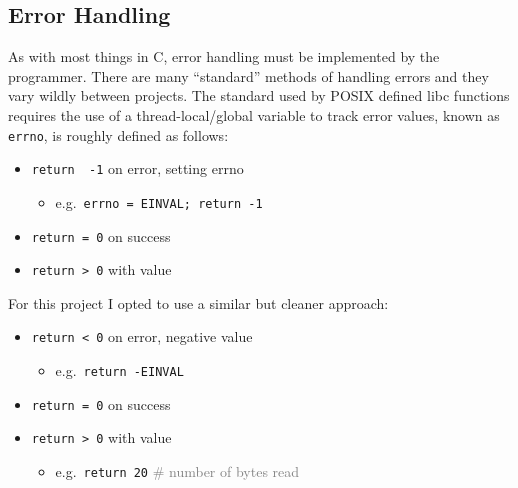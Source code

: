     \subsection{Error Handling}
        As with most things in C, error handling must be implemented by the programmer. There are many ``standard'' methods of handling errors and they vary wildly between projects. The standard used by POSIX defined libc functions requires the use of a thread-local/global variable to track error values, known as \texttt{errno}, is roughly defined as follows:
        \begin{center}
            \begin{minipage}{0.88\columnwidth}
                \begin{itemize}[noitemsep]
                    \item{\texttt{return\ \ -1} on error, setting errno}
                        \begin{itemize}
                            \item[]{\small e.g.\ \texttt{errno = EINVAL;\ return -1}}
                        \end{itemize}
                    \item{\texttt{return = 0} on success}
                    \item{\texttt{return > 0} with value}
                \end{itemize}
            \end{minipage}
        \end{center}
        \vspace{\parskip}

        For this project I opted to use a similar but cleaner approach:
        \begin{center}
            \begin{minipage}{0.88\columnwidth}
                \begin{itemize}[noitemsep]
                    \item{\texttt{return < 0} on error, negative value}
                        \begin{itemize}
                            \item[]{\small e.g.\ \texttt{return -EINVAL}}
                        \end{itemize}
                    \item{\texttt{return = 0} on success}
                    \item{\texttt{return > 0} with value}
                        \begin{itemize}
                            \item[]{\small e.g.\ \texttt{return 20} \textcolor{gray}{{\tiny\#} number of bytes read}}
                        \end{itemize}
                \end{itemize}
            \end{minipage}
        \end{center}
        \vspace{\parskip}

